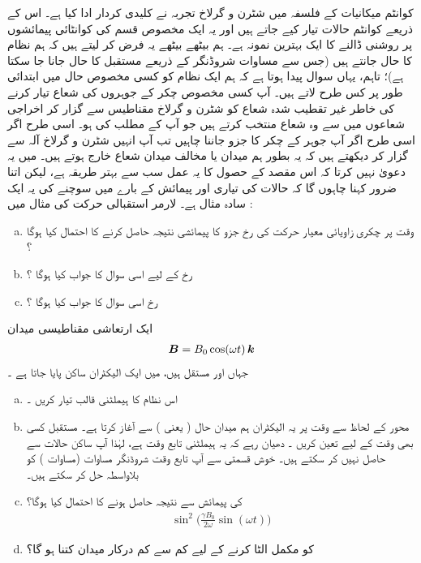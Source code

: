 کوانٹم میکانیات کے  فلسفہ  میں شٹرن و گرلاخ تجربہ نے کلیدی کردار ادا کیا ہے۔ اس کے ذریعے کوانٹم حالات تیار کیے جاتے ہیں اور یہ ایک مخصوص قسم کی کوانٹائی پیمائشوں پر روشنی ڈالنے کا ایک بہترین نمونہ ہے۔  ہم بیٹھے بیٹھے یہ فرض کر لیتے ہیں کہ ہم نظام کا  حال  جانتے ہیں  (جس سے مساوات شروڈنگر کے ذریعے مستقبل کا حال جانا جا سکتا ہے)؛  تاہم، یہاں    سوال پیدا ہوتا ہے کہ ہم ایک  نظام کو کسی مخصوص حال میں ابتدائی طور  پر  کس طرح   لاتے ہیں۔ آپ کسی مخصوص چکر کے جوہروں کی شعاع تیار کرنے کی خاطر غیر تقطیب  شدہ  شعاع کو شٹرن و گرلاخ مقناطیس سے گزار کر اخراجی شعاعوں میں سے وہ شعاع منتخب کرتے ہیں جو آپ کے مطلب کی ہو۔ اسی طرح اگر اسی طرح اگر آپ جوہر کے چکر کا  جزو جاننا چاہیں تب آپ انہیں شٹرن و گرلاخ آلہ  سے گزار کر دیکھتے ہیں کہ یہ بطور ہم میدان یا مخالف میدان شعاع خارج ہوتے ہیں۔ میں یہ دعویٰ  نہیں کرتا کہ اس مقصد کے حصول کا یہ عمل سب سے بہتر طریقہ ہے، لیکن اتنا ضرور کہنا چاہوں گا کہ حالات کی تیاری اور پیمائش کے بارے میں سوچنے کی  یہ ایک سادہ  مثال ہے۔ 
لارمر استقبالی حرکت کی    مثال    میں :
\begin{enumerate}[a.]
\item
وقت  پر چکری زاویائی معیار حرکت کی   رخ جزو کا  پیمائشی نتیجہ  حاصل کرنے کا احتمال کیا ہوگا ؟
\item
{} رخ کے لیے اسی سوال کا جواب کیا ہوگا ؟
\item 
{} رخ اسی سوال کا جواب کیا ہوگا ؟
\end{enumerate}
ایک ارتعاشی مقناطیسی میدان 
\begin{align*}
{\ensuremath{{\boldsymbol{B}}}} = B_0 \cos(\omega t) \,{\boldsymbol{k}}
\end{align*}
جہاں  اور  مستقل ہیں، میں ایک الیکٹران ساکن پایا جاتا ہے ۔
\begin{enumerate}[a.]
\item
اس نظام کا ہیملٹنی قالب تیار کریں ۔
\item
محور  کے لحاظ سے وقت  پر یہ الیکٹران  ہم  میدان حال ( یعنی )    سے آغاز  کرتا ہے۔ مستقبل   کسی بھی وقت کے لیے  تعین کریں ۔ دھیان رہے کہ یہ ہیملٹنی تابع وقت ہے، لہٰذا آپ ساکن حالات سے  حاصل نہیں کر سکتے ہیں۔ خوش قسمتی سے آپ تابع وقت شروڈنگر مساوات (مساوات  )  کو بلاواسطہ حل کر سکتے ہیں۔ 
\item
{} کی پیمائش سے   نتیجہ حاصل  ہونے کا احتمال کیا ہوگا؟  
\begin{align*}
\sin^2 \big ( \frac{\gamma B_0}{2 \omega} \sin(\omega t) \big )
\end{align*}
\item
{} کو مکمل الٹا کرنے کے لیے کم سے کم  درکار میدان  کتنا ہو گا؟   
\end{enumerate}
